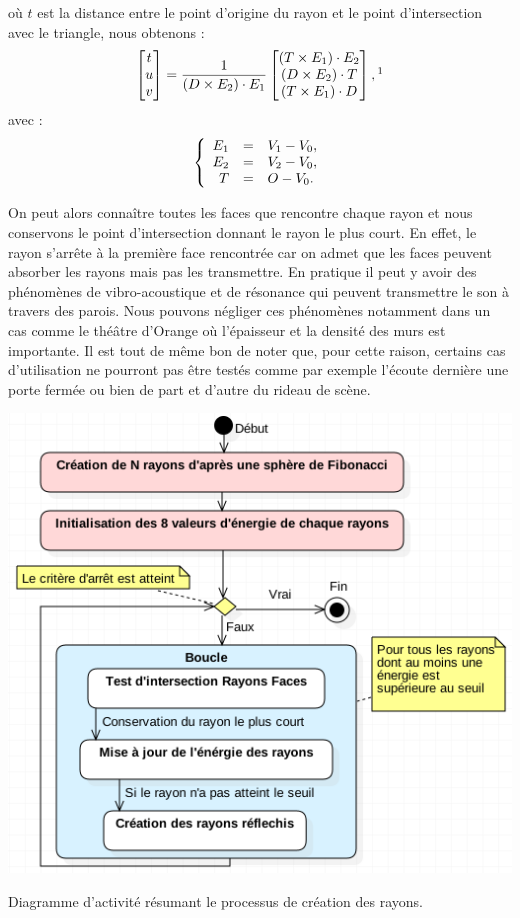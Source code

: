 %
où $t$ est la distance entre le point d'origine du rayon et le point d'intersection avec le triangle, nous obtenons :
%
\begin{equation}
	\begin{bmatrix}
 	 t \\
	 u \\
	 v
	\end{bmatrix}
	=
	\frac{1}{
 	  (D \times E_2)\cdot E_1
	}
	\begin{bmatrix}
 		  (T \times E_1)\cdot E_2
 \\ 
 		  (D \times E_2)\cdot T
 \\
 		  (T \times E_1)\cdot D
	\end{bmatrix}	,
	\footnotemark
\end{equation}
avec : 
\begin{equation}
   \left \{
   \begin{array}{r c l}
E_1 &=&  V_1-V_0,  \\
E_2 &=&  V_2-V_0,  \\
T &=& O - V_0.
   \end{array}
   \right .
\end{equation}
%

On peut alors connaître toutes les faces que rencontre chaque rayon et nous conservons le point d'intersection donnant le rayon le plus court. En effet, le rayon s'arrête à la première face rencontrée car on admet que les faces peuvent absorber les rayons mais pas les transmettre. En pratique il peut y avoir des phénomènes de vibro-acoustique et de résonance qui peuvent transmettre le son à travers des parois. Nous pouvons négliger ces phénomènes notamment dans un cas comme le théâtre d'Orange où l'épaisseur et la densité des murs est importante. Il est tout de même bon de noter que, pour cette raison, certains cas d'utilisation ne pourront pas être testés comme par exemple l'écoute dernière une porte fermée ou bien de part et d'autre du rideau de scène.

\begin{figureth}
	\includegraphics[width=0.7\linewidth]{images/DiagRay}
	\caption{Diagramme d'activité résumant le processus de création des rayons.}
	\label{DiagRay}
\end{figureth}

